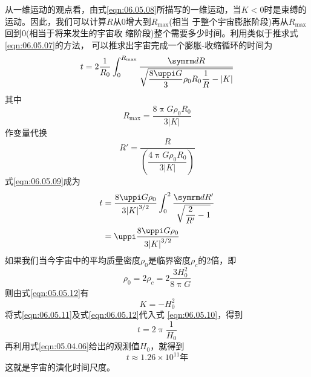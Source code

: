 从一维运动的观点看，由式\eqref{eqn:06.05.08}所描写的一维运动，当$ K
  <0 $时是束缚的运动。因此，我们可以计算$ R $从0增大到$ R_{\max} $(相当
于整个宇宙膨胀阶段)再从$ R_{\max} $回到0(相当于将来发生的宇宙收
缩阶段)整个需要多少时间。利用类似于推求式\eqref{eqn:06.05.07}的方法，
可以推求出宇宙完成一个膨胀-收缩循环的时间为
\begin{equation}\label{eqn:06.05.09}
  t = 2 \frac { 1 } { R _ { 0 } } \int _ 0 ^ { R _ { \max } } \frac { \dif R } { \sqrt { \dfrac { 8 \uppi G } { 3 } \rho _ { 0 } R _ { 0 } \dfrac { 1 } { R } - | K | } }
\end{equation}
其中
\begin{equation*}
  R _ { \max } = \frac { 8 \uppi G \rho _ { 0 } R _ { 0 } } { 3 | K | }
\end{equation*}
作变量代换
\begin{equation*}
  R ' = \frac { R } { \left( \dfrac { 4 \uppi G \rho _ { 0 } R _ { 0 } } { 3 | K | } \right) }
\end{equation*}
式\eqref{eqn:06.05.09}成为
\begin{equation}\label{eqn:06.05.10}
  \begin{aligned}
    t & = \frac { 8 \uppi G \rho _ { 0 } } { 3 { | K | } ^ { 3 / 2 } } \int _ { 0 } ^ { 2 } \frac { \dif R ' } { \sqrt { \dfrac { 2 } { R ' } - 1 } } \\
      & = \uppi \frac { 8 \uppi G \rho _ { 0 } } { 3 { | K | } ^ { 3 / 2 } }
  \end{aligned}
\end{equation}
如果我们当今宇宙中的平均质量密度$ \rho _ 0 $是临界密度$ \rho _ c $的2倍，即
\begin{equation}\label{eqn:06.05.11}
  \rho _ { 0 } = 2 \rho _ { c } = 2 \frac { 3 H _ 0 ^ { 2 } } { 8 \uppi G }
\end{equation}
则由式\eqref{eqn:05.05.12}有
\begin{equation}\label{eqn:06.05.12}
  K = - H _ { 0 } ^ { 2 }
\end{equation}
将式\eqref{eqn:06.05.11}及式\eqref{eqn:06.05.12}代入式 \eqref{eqn:06.05.10}，得到
\begin{equation}\label{eqn:06.05.13}
  t = 2 \uppi \frac { 1 } { H _ { 0 } }
\end{equation}
再利用式\eqref{eqn:05.04.06}给出的观测值$ H _ { 0 } $，就得到
\begin{equation*}
  t \approx 1.26 \times 10 ^ { 11 } \text{年}
\end{equation*}
这就是宇宙的演化时间尺度。
